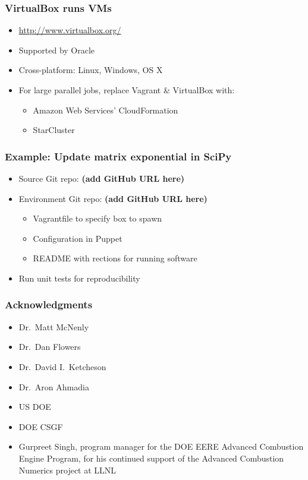 \documentclass [14pt]{beamer}
\begin{document}
\begin{frame}
\frametitle{VirtualBox runs VMs}
\begin{itemize}
\item \url{http://www.virtualbox.org/}
\item Supported by Oracle
\item Cross-platform: Linux, Windows, OS X
\item For large parallel jobs, replace Vagrant \& VirtualBox with:
\begin{itemize}
\item Amazon Web Services' CloudFormation
\item StarCluster
\end{itemize}
\end{itemize}
\end{frame}

\begin{frame}
\frametitle{Example: Update matrix exponential in SciPy}
\begin{itemize}
\item Source Git repo: \textbf{(add GitHub URL here)}
\item Environment Git repo: \textbf{(add GitHub URL here)}
\begin{itemize}
\item Vagrantfile to specify box to spawn
\item Configuration in Puppet
\item README with rections for running software
\end{itemize}
\item Run unit tests for reproducibility
\end{itemize}
\end{frame}

\begin{frame}
\frametitle{Acknowledgments}
\begin{itemize}
\item Dr.\ Matt McNenly
\item Dr.\ Dan Flowers
\item Dr.\ David I.\ Ketcheson
\item Dr.\ Aron Ahmadia
\item US DOE
\item DOE CSGF
\item Gurpreet Singh, program manager for the DOE EERE Advanced
  Combustion Engine Program, for his continued support of the Advanced
  Combustion Numerics project at LLNL
\end{itemize}
\end{frame}

\begin{frame}
\end{frame}
\end{document}
